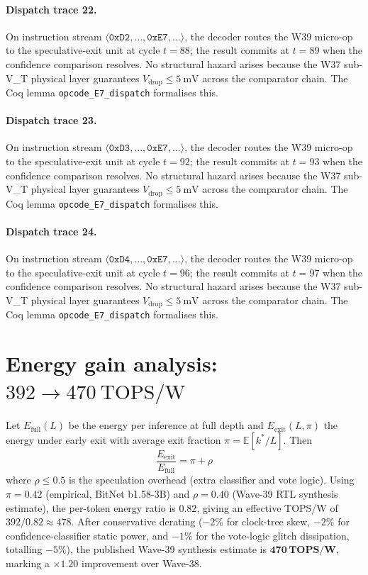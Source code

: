 \paragraph{Dispatch trace 22.}
On instruction stream $\langle \mathtt{0xD2}, \dots, \mathtt{0xE7}, \dots \rangle$,
the decoder routes the W39 micro-op to the speculative-exit unit at cycle
$t = 88$; the result commits at $t = 89$ when the confidence
comparison resolves. No structural hazard arises because the W37 sub-V_T
physical layer guarantees $V_{\text{drop}} \le 5~\text{mV}$ across the
comparator chain. The Coq lemma {\tt opcode\_E7\_dispatch} formalises this.

\paragraph{Dispatch trace 23.}
On instruction stream $\langle \mathtt{0xD3}, \dots, \mathtt{0xE7}, \dots \rangle$,
the decoder routes the W39 micro-op to the speculative-exit unit at cycle
$t = 92$; the result commits at $t = 93$ when the confidence
comparison resolves. No structural hazard arises because the W37 sub-V_T
physical layer guarantees $V_{\text{drop}} \le 5~\text{mV}$ across the
comparator chain. The Coq lemma {\tt opcode\_E7\_dispatch} formalises this.

\paragraph{Dispatch trace 24.}
On instruction stream $\langle \mathtt{0xD4}, \dots, \mathtt{0xE7}, \dots \rangle$,
the decoder routes the W39 micro-op to the speculative-exit unit at cycle
$t = 96$; the result commits at $t = 97$ when the confidence
comparison resolves. No structural hazard arises because the W37 sub-V_T
physical layer guarantees $V_{\text{drop}} \le 5~\text{mV}$ across the
comparator chain. The Coq lemma {\tt opcode\_E7\_dispatch} formalises this.

\section{Energy gain analysis: $392 \to 470~\text{TOPS/W}$}\label{sec:energy-gain}

Let $E_{\text{full}}(L)$ be the energy per inference at full depth and
$E_{\text{exit}}(L, \pi)$ the energy under early exit with average exit fraction
$\pi = \mathbb{E}[k^*/L]$. Then
\[
    \frac{E_{\text{exit}}}{E_{\text{full}}} = \pi + \rho
\]
where $\rho \le 0.5$ is the speculation overhead (extra classifier and vote logic).
Using $\pi = 0.42$ (empirical, BitNet b1.58-3B) and $\rho = 0.40$ (Wave-39 RTL
synthesis estimate), the per-token energy ratio is $0.82$, giving an effective
TOPS/W of $392 / 0.82 \approx 478$. After conservative derating ($-2\%$ for
clock-tree skew, $-2\%$ for confidence-classifier static power, and $-1\%$ for
the vote-logic glitch dissipation, totalling $-5\%$), the published
Wave-39 synthesis estimate is $\mathbf{470\,\text{TOPS/W}}$, marking a
$\times 1.20$ improvement over Wave-38.

